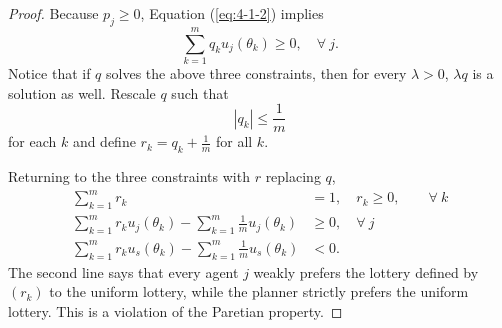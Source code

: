 \begin{proof}
	Because $p_j \ge 0$, Equation (\ref{eq:4-1-2}) implies
	\[
		\sum\limits_{k=1}^{m} q_k u_j(\theta_k) \ge 0, \quad \forall\ j
	.\] 
	Notice that if $q$ solves the above three constraints, then for every $\lambda > 0$, $\lambda q$ is a solution as well. Rescale $q$ such that \[
		\left| q_k \right| \le \frac{1}{m}
	\] for each $k$ and define $r_k = q_k + \frac{1}{m}$ for all $k$. 

	Returning to the three constraints with $r$ replacing $q$, 
	\begin{align*}
		\sum\limits_{k=1}^{m} r_k &= 1, \quad r_k \ge 0, \qquad \forall\ k \\
		\sum\limits_{k=1}^{m} r_k u_j(\theta_k) - \sum\limits_{k=1}^{m} \frac{1}{m} u_j(\theta_k) &\ge 0, \quad \forall\ j \\
		\sum\limits_{k=1}^{m} r_k u_s(\theta_k) - \sum\limits_{k=1}^{m} \frac{1}{m} u_s(\theta_k) &< 0
	.\end{align*}
	The second line says that every agent $j$ weakly prefers the lottery defined by $(r_k)$ to the uniform lottery, while the planner strictly prefers the uniform lottery. This is a violation of the Paretian property.
\end{proof}

